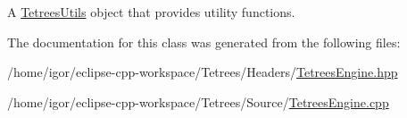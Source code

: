 A \hyperlink{classTetreesUtils}{Tetrees\+Utils} object that provides utility functions. 

The documentation for this class was generated from the following files\+:\begin{DoxyCompactItemize}
\item 
/home/igor/eclipse-\/cpp-\/workspace/\+Tetrees/\+Headers/\hyperlink{TetreesEngine_8hpp}{Tetrees\+Engine.\+hpp}\item 
/home/igor/eclipse-\/cpp-\/workspace/\+Tetrees/\+Source/\hyperlink{TetreesEngine_8cpp}{Tetrees\+Engine.\+cpp}\end{DoxyCompactItemize}
